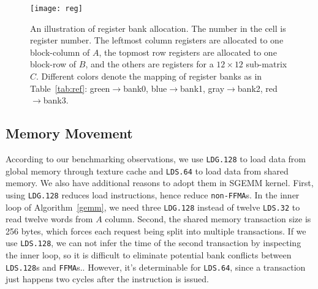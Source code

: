 \begin{figure}[htbp]
\begin{center}
\texttt{[image: reg]}
\caption{An illustration of register bank allocation. The number in the cell is register number.
    The leftmost column registers are allocated to one block-column of $A$, the
topmost row registers are allocated to one block-row of $B$, and the others are registers for
a $12 \times 12$ sub-matrix $C$. Different colors denote the mapping of register banks as in Table~\ref{tab:ref}: green$\rightarrow$bank0,
blue$\rightarrow$bank1, gray$\rightarrow$bank2, red$\rightarrow$bank3.}
\label{fig:reg}
\end{center}
\end{figure}


\subsection{Memory Movement}
According to our benchmarking observations, we use {\tt LDG.128} to load data from global memory through texture cache
and {\tt LDS.64} to load data from shared memory.
We also have additional reasons to adopt them in SGEMM kernel.
First, using {\tt LDG.128} reduces load instructions, hence reduce {\tt non-FFMA}s. %
In the inner loop of Algorithm~\ref{gemm}, we need three {\tt LDG.128} instead of twelve {\tt LDS.32} to read twelve
words from $A$ column.
Second, the shared memory transaction size is 256 bytes, which forces each request being split into multiple transactions.
If we use {\tt LDS.128}, we can not infer the time of the second transaction by inspecting the inner loop, so it is
difficult to eliminate potential bank conflicts between {\tt LDS.128}s and {\tt FFMA}s..
However, it's determinable for {\tt LDS.64}, since a transaction just happens two cycles after the instruction is
issued. 


